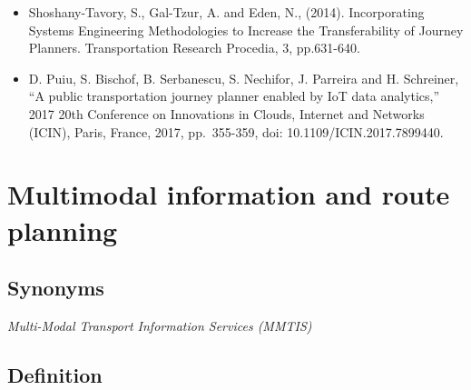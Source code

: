 \documentclass[
]{book}
\begin{document}
\begin{itemize}
\item
  Shoshany-Tavory, S., Gal-Tzur, A. and Eden, N., (2014). Incorporating Systems Engineering Methodologies to Increase the Transferability of Journey Planners. Transportation Research Procedia, 3, pp.631-640.
\item
  D. Puiu, S. Bischof, B. Serbanescu, S. Nechifor, J. Parreira and H. Schreiner, ``A public transportation journey planner enabled by IoT data analytics,'' 2017 20th Conference on Innovations in Clouds, Internet and Networks (ICIN), Paris, France, 2017, pp.~355-359, doi: 10.1109/ICIN.2017.7899440.
\end{itemize}

\hypertarget{info_and_route_planning}{%
\section{Multimodal information and route planning}\label{info_and_route_planning}}

\hypertarget{synonyms-14}{%
\subsection*{Synonyms}\label{synonyms-14}}

\emph{Multi-Modal Transport Information Services (MMTIS)}

\hypertarget{definition-15}{%
\subsection*{Definition}\label{definition-15}}
\end{document}
